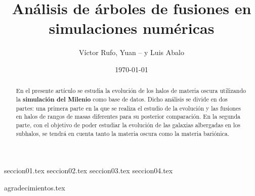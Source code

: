 \documentclass[a4paper, amsfonts, amssymb, amsmath, reprint, showkeys, nofootinbib, twoside]{revtex4-1}
\begin{document}
\renewcommand{\tablename}{\textit{Tabla}}
\renewcommand{\figurename}{\textit{Figura}}

\title{Análisis de árboles de fusiones en simulaciones numéricas}

\author{Víctor Rufo, Yuan -- y Luis Abalo}

\date{\today} %

\begin{abstract}
En el presente artículo se estudia la evolución de los halos de materia oscura utilizando la \textbf{simulación del Milenio} como base de datos. Dicho análisis se divide en dos partes: una primera parte en la que se realiza el estudio de la evolución y las fusiones en halos de rangos de masas diferentes para su posterior comparación. En la segunda parte, con el objetivo de poder estudiar la evolución de las galaxias albergadas en los subhalos, se tendrá en cuenta tanto la materia oscura como la materia bariónica.   
\end{abstract}


\maketitle


{seccion01.tex} 
{seccion02.tex}
{seccion03.tex}
{seccion04.tex}

{agradecimientos.tex}
\end{document}
